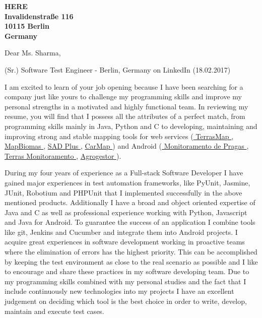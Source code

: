 \documentclass[a4paper]{joaosoares-letter}
\begin{document}
\longindentation=0pt

\begin{letter}{\bfseries HERE\\Invalidenstraße 116\\10115 Berlin\\Germany}


\date{Belém, \today}

\opening{Dear Ms. Sharma,}{(Sr.) Software Test Engineer - Berlin, Germany on LinkedIn (18.02.2017)}

I am excited to learn of your job opening because I have been searching for a company just like yours to challenge my programming skills and improve my personal strengths in a motivated and highly functional team. In reviewing my resume, you will find that I possess all the attributes of a perfect match, from programming skills mainly in Java, Python and C to developing, maintaining and improving strong and stable mapping tools for web services (\href{https://goo.gl/6gUzPA}{ TerrasMap }, \href{https://goo.gl/eYX5SW}{ MapBiomas }, \href{https://goo.gl/2J41hR}{ SAD Plus }, \href{https://goo.gl/fCCp9s}{ CarMap }) and Android (\href{https://goo.gl/RcdbHk}{ Monitoramento de Pragas }, \href{https://goo.gl/OyZXke}{ Terras Monitoramento }, \href{https://goo.gl/mycBmL}{ Agrogestor }).

During my four years of experience as a Full-stack Software Developer I have gained major experiences in test automation frameworks, like PyUnit, Jasmine, JUnit, Robotium and PHPUnit that I implemented successfully in the above mentioned products. Additionally I have a broad and object oriented expertise of Java and C as well as professional experience working with Python, Javascript and Java for Android. To guarantee the success of an application I combine tools like git, Jenkins and Cucumber and integrate them into Android projects. I acquire great experiences in software development working in proactive teams where the elimination of errors has the highest priority. This can be accomplished by keeping the test environment as close to the real scenario as possible and I like to encourage and share these practices in my software developing team. Due to my programming skills combined with my personal studies and the fact that I include continuously new technologies into my projects I have an excellent judgement on deciding which tool is the best choice in order to write, develop, maintain and execute test cases.


\end{letter}
\end{document}
